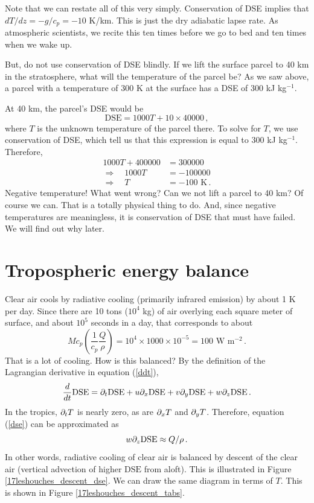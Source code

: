 \documentclass[12pt]{article}
\newcommand{\dse}{{\text{DSE}}}
\begin{document}
Note that we can restate all of this very simply.  Conservation of DSE implies that $dT/dz = -g/c_p = -10$ K/km.  This is just the dry adiabatic lapse rate.  As atmospheric scientists, we recite this ten times before we go to bed and ten times when we wake up.


But, do not use conservation of DSE blindly.  If we lift the surface parcel to 40 km in the stratosphere, what will the temperature of the parcel be?  As we saw above, a parcel with a temperature of 300 K at the surface has a DSE of 300 kJ kg$^{-1}$.

At 40 km, the parcel's DSE would be
\[
\dse{} = 1000 T + 10 \times 40000 \, ,
\]
where $T$ is the unknown temperature of the parcel there.  To solve for $T$, we use conservation of DSE, which tell us that this expression is equal to 300 kJ kg$^{-1}$.  Therefore,
\begin{align}
1000 T + 400000 &= 300000 \\
\Rightarrow \quad 1000 T &= -100000 \\
\Rightarrow \quad T &= -100 \text{ K} \, .
\end{align}
Negative temperature!  What went wrong?  Can we not lift a parcel to 40 km?  Of course we can.  That is a totally physical thing to do.  And, since negative temperatures are meaningless, it is conservation of DSE that must have failed.  We will find out why later.


\section{Tropospheric energy balance}


Clear air cools by radiative cooling (primarily infrared emission) by about 1 K per day.  Since there are 10 tons ($10^4$ kg) of air overlying each square meter of surface, and about $10^5$ seconds in a day, that corresponds to about
\[
M c_p \left( \frac{1}{c_p} \frac{Q}{\rho} \right) = 10^4 \times 1000 \times 10^{-5} = 100 \text{ W m$^{-2}$} \, .
\]
That is a lot of cooling.  How is this balanced?  By the definition of the Lagrangian derivative in equation (\ref{ddt}),
\[
\ddt \dse = \ppt \dse + u \ppx \dse + v \ppy \dse + w \ppz \dse \, .
\]
In the tropics, $\partial_t T$ is nearly zero, as are $\partial_x T$ and $\partial_y T$.  Therefore, equation (\ref{dse}) can be approximated as
\[
w \ppz \dse \approx Q/\rho \, .
\]
In other words, radiative cooling of clear air is balanced by descent of the clear air (vertical advection of higher $\dse{}$ from aloft).  This is illustrated in Figure \ref{17leshouches_descent_dse}.  We can draw the same diagram in terms of $T$.  This is shown in Figure \ref{17leshouches_descent_tabs}.
\end{document}
